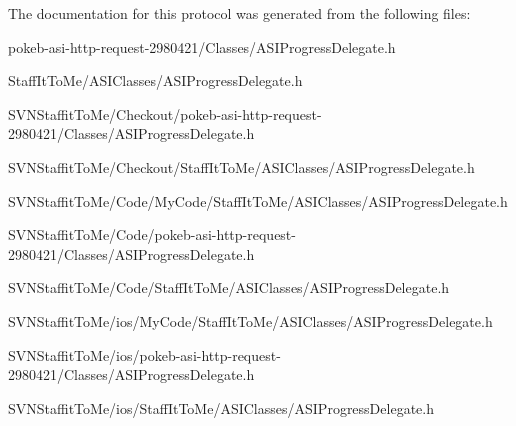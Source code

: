 \-The documentation for this protocol was generated from the following files\-:\begin{DoxyCompactItemize}
\item 
pokeb-\/asi-\/http-\/request-\/2980421/\-Classes/\-A\-S\-I\-Progress\-Delegate.\-h\item 
\-Staff\-It\-To\-Me/\-A\-S\-I\-Classes/\-A\-S\-I\-Progress\-Delegate.\-h\item 
\-S\-V\-N\-Staffit\-To\-Me/\-Checkout/pokeb-\/asi-\/http-\/request-\/2980421/\-Classes/\-A\-S\-I\-Progress\-Delegate.\-h\item 
\-S\-V\-N\-Staffit\-To\-Me/\-Checkout/\-Staff\-It\-To\-Me/\-A\-S\-I\-Classes/\-A\-S\-I\-Progress\-Delegate.\-h\item 
\-S\-V\-N\-Staffit\-To\-Me/\-Code/\-My\-Code/\-Staff\-It\-To\-Me/\-A\-S\-I\-Classes/\-A\-S\-I\-Progress\-Delegate.\-h\item 
\-S\-V\-N\-Staffit\-To\-Me/\-Code/pokeb-\/asi-\/http-\/request-\/2980421/\-Classes/\-A\-S\-I\-Progress\-Delegate.\-h\item 
\-S\-V\-N\-Staffit\-To\-Me/\-Code/\-Staff\-It\-To\-Me/\-A\-S\-I\-Classes/\-A\-S\-I\-Progress\-Delegate.\-h\item 
\-S\-V\-N\-Staffit\-To\-Me/ios/\-My\-Code/\-Staff\-It\-To\-Me/\-A\-S\-I\-Classes/\-A\-S\-I\-Progress\-Delegate.\-h\item 
\-S\-V\-N\-Staffit\-To\-Me/ios/pokeb-\/asi-\/http-\/request-\/2980421/\-Classes/\-A\-S\-I\-Progress\-Delegate.\-h\item 
\-S\-V\-N\-Staffit\-To\-Me/ios/\-Staff\-It\-To\-Me/\-A\-S\-I\-Classes/\-A\-S\-I\-Progress\-Delegate.\-h\end{DoxyCompactItemize}
